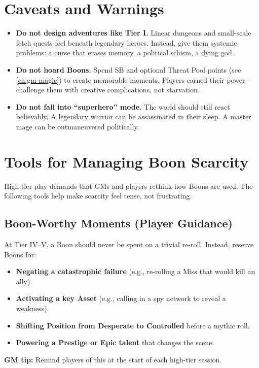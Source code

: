 \section{Caveats and Warnings}

\begin{itemize}
  \item \textbf{Do not design adventures like Tier I.} Linear dungeons and small-scale fetch quests feel beneath legendary heroes. Instead, give them systemic problems: a curse that erases memory, a political schism, a dying god.
  \item \textbf{Do not hoard Boons.} Spend SB and optional Threat Pool points (see \ref{ch:gm-magic}) to create memorable moments. Players earned their power -- challenge them with creative complications, not starvation.
  \item \textbf{Do not fall into ``superhero'' mode.} The world should still react believably. A legendary warrior can be assassinated in their sleep. A master mage can be outmaneuvered politically.
\end{itemize}

\section{Tools for Managing Boon Scarcity}

High-tier play demands that GMs and players rethink how Boons are used. The following tools help make scarcity feel tense, not frustrating.

\subsection*{Boon-Worthy Moments (Player Guidance)}
At Tier IV--V, a Boon should never be spent on a trivial re-roll. Instead, reserve Boons for:
\begin{itemize}
  \item \textbf{Negating a catastrophic failure} (e.g., re-rolling a Miss that would kill an ally).
  \item \textbf{Activating a key Asset} (e.g., calling in a spy network to reveal a weakness).
  \item \textbf{Shifting Position from Desperate to Controlled} before a mythic roll.
  \item \textbf{Powering a Prestige or Epic talent} that changes the scene.
\end{itemize}
\textbf{GM tip:} Remind players of this at the start of each high-tier session.

